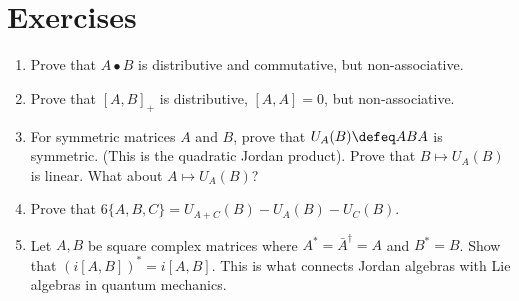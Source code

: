 \section*{Exercises}
\begin{enumerate}
\item Prove that $A\bullet B$ is distributive and commutative, but non-associative.

\item Prove that $[A,B]_+$ is distributive, $[A,A]=0$, but non-associative.

\item For symmetric matrices $A$ and $B$, prove that $U_A(B)\defeq ABA$ is symmetric.
(This is the quadratic Jordan product).  Prove that $B\mapsto U_A(B)$ is linear.  What 
about $A\mapsto U_A(B)$?

\item Prove that $6\{A,B,C\}=U_{A+C}(B)-U_A(B)-U_C(B)$.

\item Let $A,B$ be square complex matrices where $A^*=\bar{A}^{\dagger}=A$ and 
$B^*=B$.  Show that $(i[A,B])^*=i[A,B]$.  This is what connects Jordan algebras 
with Lie algebras in quantum mechanics.
\end{enumerate}
